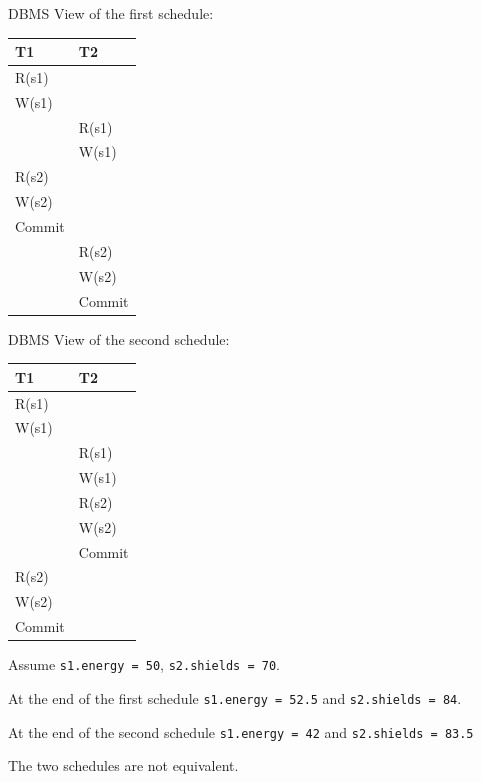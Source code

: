 \documentclass{beamer}
\begin{document}
\begin{slide}{
		\item DBMS View of the first schedule:
		\begin{table}
			\tiny
			\begin{tabular}{l|l}
				T1 & T2\\
				\hline
				R(s1) & \\
				W(s1) & \\
				& R(s1) \\
				& W(s1) \\
				R(s2) & \\
				W(s2) & \\
				Commit & \\
				& R(s2) \\
				& W(s2) \\
				& Commit\\		
			\end{tabular}
		\end{table}
		\item DBMS View of the second schedule:
		\begin{table}
			\tiny
			\begin{tabular}{l|l}
				T1 & T2\\
				\hline
				R(s1) & \\
				W(s1) & \\
				 & R(s1) \\
				 & W(s1) \\
				 & R(s2) \\
				 & W(s2) \\
				 & Commit \\
				 R(s2) \\
				 W(s2) \\
				 Commit \\		
			\end{tabular}
		\end{table}
}\end{slide}

\begin{slide}{
	\item Assume \texttt{s1.energy = 50}, \texttt{s2.shields = 70}.
	\item At the end of the first schedule \texttt{s1.energy = 52.5} and \texttt{s2.shields = 84}.
	\item At the end of the second schedule \texttt{s1.energy = 42} and \texttt{s2.shields = 83.5}
	\item The two schedules are not equivalent.
}\end{slide}
\end{document}
